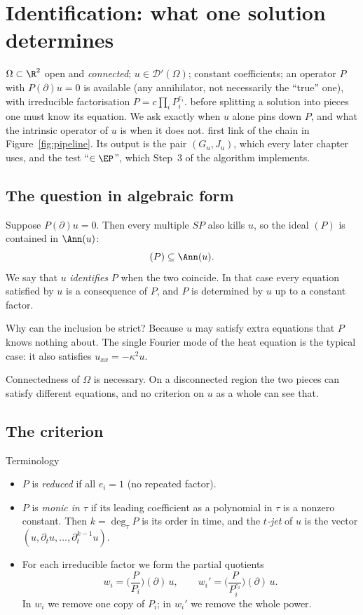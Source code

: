 \chapter{Identification: what one solution determines}\label{ch:ident}
\chapterbrief
{$\Omega\subset\R^2$ open and \emph{connected}; $u\in\mathcal D'(\Omega)$; constant coefficients; an operator $P$ with $P(\partial)u=0$ is available (any annihilator, not necessarily the ``true'' one), with irreducible factorisation $P=c\prod_iP_i^{e_i}$.}
{before splitting a solution into pieces one must know its equation. We ask exactly when $u$ alone pins down $P$, and what the intrinsic operator of $u$ is when it does not.}
{first link of the chain in Figure~\ref{fig:pipeline}. Its output is the pair $(G_u,J_u)$, which every later chapter uses, and the test ``$\in\EP$'', which Step~3 of the algorithm implements.}

\section{The question in algebraic form}

Suppose $P(\partial)u=0$. Then every multiple $SP$ also kills $u$, so the ideal $(P)$ is contained in $\Ann(u)$:
\[
(P)\subseteq\Ann(u).
\]
We say that $u$ \emph{identifies} $P$ when the two coincide. In that case every equation satisfied by $u$ is a consequence of $P$, and $P$ is determined by $u$ up to a constant factor.

Why can the inclusion be strict? Because $u$ may satisfy extra equations that $P$ knows nothing about. The single Fourier mode of the heat equation is the typical case: it also satisfies $u_{xx}=-\kappa^2u$.

Connectedness of $\Omega$ is necessary. On a disconnected region the two pieces can satisfy different equations, and no criterion on $u$ as a whole can see that.

\section{The criterion}

\begin{notebox}{Terminology}
\begin{itemize}
\item $P$ is \emph{reduced} if all $e_i=1$ (no repeated factor).
\item $P$ is \emph{monic in $\tau$} if its leading coefficient as a polynomial in $\tau$ is a nonzero constant. Then $k=\deg_\tau P$ is its order in time, and the \emph{$t$-jet} of $u$ is the vector $(u,\partial_tu,\dots,\partial_t^{k-1}u)$.
\item For each irreducible factor we form the partial quotients
\[
w_i=\Big(\frac{P}{P_i}\Big)(\partial)\,u,\qquad
w_i'=\Big(\frac{P}{P_i^{e_i}}\Big)(\partial)\,u .
\]
In $w_i$ we remove one copy of $P_i$; in $w_i'$ we remove the whole power.
\end{itemize}
\end{notebox}

